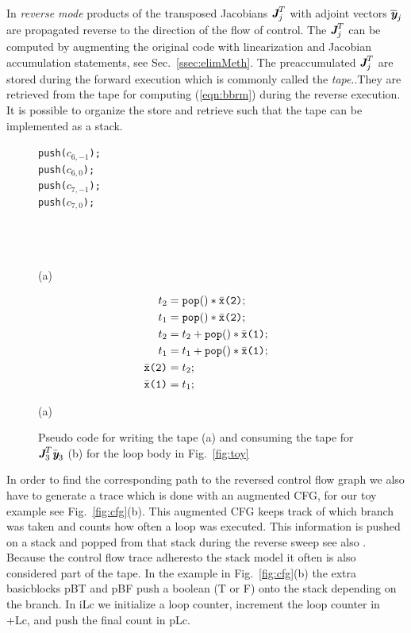 \documentclass[11pt]{article}
\newcommand{\basicblock}{basicblock}
\newcommand{\bmJ}{\mbox{\bf\em J}}
\newcommand{\bmy}{\mbox{\bf\em y}}
\newcommand{\code}[1]{{\small\tt{#1}}}
\newcommand{\refsec}[1]{{Sec.~\ref{#1}}}
\newcommand{\reffig}[1]{{Fig.~\ref{#1}}}
\newcommand{\refeqn}[1]{{(\ref{#1})}}
\begin{document}
In {\em reverse mode} products of the transposed
Jacobians $\bmJ^T_j$ with adjoint vectors $\overline{\bmy}_j$
are propagated reverse to the direction of the flow of control.
The $\bmJ^T_j$ can be computed by augmenting the original code with 
linearization and Jacobian accumulation statements, see \refsec{ssec:elimMeth}.
The preaccumulated  $\bmJ^T_j$ are stored during the forward execution
which is commonly called the {\em tape}..They are retrieved from the 
tape for computing \refeqn{eqn:bbrm} during the reverse execution. 
It is possible to organize the store and retrieve such that the tape can be 
implemented as a stack.
\begin{figure}[h]
  \begin{center}
    \begin{minipage}[b]{.2\linewidth}
      \code{push(}$c_{6,-1}$\code{);}\\
      \code{push(}$c_{6,0}$\code{);}\\
      \code{push(}$c_{7,-1}$\code{);}\\
      \code{push(}$c_{7,0}$\code{);}\\
      \\ \\ \\
      \centerline{(a)}
    \end{minipage}
    \begin{minipage}[b]{.2\linewidth}
      \small
      \begin{align*}
        t_2&=\code{pop()}*\bar{\tt x}\mbox{\tt (2)};\\
        t_1&=\code{pop()}*\bar{\tt x}\mbox{\tt (2)};\\
        t_2&=t_2+\code{pop()}*\bar{\tt x}\mbox{\tt (1)};\\
        t_1&=t_1+\code{pop()}*\bar{\tt x}\mbox{\tt (1)};\\
        \bar{\tt x}\mbox{\tt (2)}& =t_2;\\
        \bar{\tt x}\mbox{\tt (1)}& =t_1;
      \end{align*}
      \centerline{(a)}
    \end{minipage}
  \end{center}	
  \caption{Pseudo code for writing the tape (a) and consuming the tape for  $\bmJ_3^T\bar{\bmy}_3$ (b) for  the loop body in \reffig{fig:toy}}\label{fig:toyPreacc}
\end{figure}

In order to find the corresponding path to the reversed control flow graph 
we also have to generate a trace which is done with an augmented CFG,
for our toy example see \reffig{fig:cfg}(b).
This augmented CFG  keeps track of which branch was taken and counts how 
often a loop was 
executed.  
This information is pushed on  a stack and popped from that stack during the 
reverse sweep see also \cite{scam2004}. Because the control flow trace 
adheresto the stack model it often is also considered part of the tape. 
In the example in \reffig{fig:cfg}(b) the extra {\basicblock}s pBT and pBF push 
a boolean (T or F) onto the stack depending on the branch. 
In iLc we initialize a loop counter, increment the loop counter in +Lc, 
and push the final count in pLc. 
\end{document}
